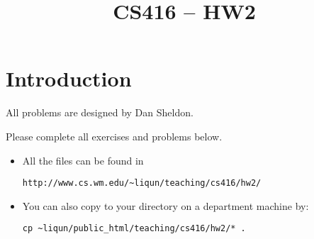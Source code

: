 \documentclass{article}
\title{CS416 -- HW2}
\date{}
\begin{document}
\maketitle


\section*{Introduction}
All problems are designed by Dan Sheldon. 

Please complete all exercises and problems below.

\begin{itemize}

\item All the files can be found in 

\begin{verbatim}
http://www.cs.wm.edu/~liqun/teaching/cs416/hw2/
\end{verbatim}



\item  You can also copy to your directory on a department machine by:

\begin{verbatim}
cp ~liqun/public_html/teaching/cs416/hw2/* .
\end{verbatim}

\end{itemize}
\end{document}
